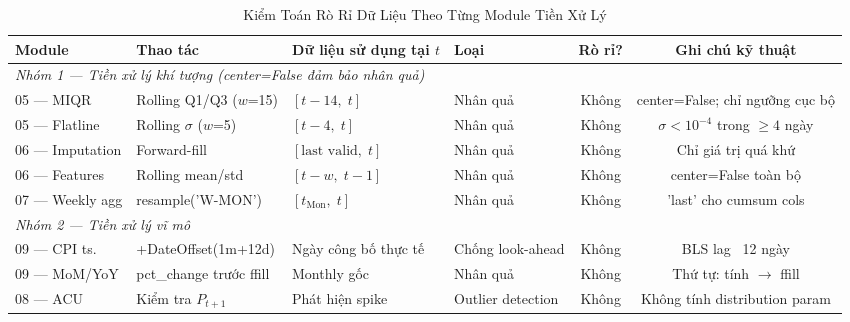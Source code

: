 


\begin{table}[htbp]
\caption{Kiểm Toán Rò Rỉ Dữ Liệu Theo Từng Module Tiền Xử Lý}
\label{tab:leakage_audit}
\centering
\begin{threeparttable}
\begin{tabular}{@{}llllcc@{}}
\toprule
\textbf{Module} & \textbf{Thao tác} & \textbf{Dữ liệu sử dụng tại $t$} & \textbf{Loại} & \textbf{Rò rỉ?} & \textbf{Ghi chú kỹ thuật} \\
\midrule
\multicolumn{6}{l}{\textit{Nhóm 1 — Tiền xử lý khí tượng (center=False đảm bảo nhân quả)}} \\
\midrule
05 --- MIQR      & Rolling Q1/Q3 ($w$=15) & $[t{-}14,\; t]$       & Nhân quả   & Không & center=False; chỉ ngưỡng cục bộ \\
05 --- Flatline  & Rolling $\sigma$ ($w$=5)& $[t{-}4,\; t]$        & Nhân quả   & Không & $\sigma < 10^{-4}$ trong $\geq4$ ngày \\
06 --- Imputation& Forward-fill            & $[\text{last valid},\; t]$ & Nhân quả & Không & Chỉ giá trị quá khứ \\
06 --- Features  & Rolling mean/std        & $[t{-}w,\; t{-}1]$    & Nhân quả   & Không & center=False toàn bộ \\
07 --- Weekly agg& resample('W-MON')       & $[t_\text{Mon},\; t]$ & Nhân quả   & Không & 'last' cho cumsum cols\tnote{a} \\
\midrule
\multicolumn{6}{l}{\textit{Nhóm 2 — Tiền xử lý vĩ mô}} \\
\midrule
09 --- CPI ts.   & +DateOffset(1m+12d)     & Ngày công bố thực tế  & Chống look-ahead & Không & BLS lag ~12 ngày \\
09 --- MoM/YoY   & pct\_change trước ffill & Monthly gốc           & Nhân quả   & Không & Thứ tự: tính $\to$ ffill \\
08 --- ACU       & Kiểm tra $P_{t+1}$      & Phát hiện spike        & Outlier detection & Không\tnote{b} & Không tính distribution param \\

\end{tabular}
\end{threeparttable}
\end{table}
